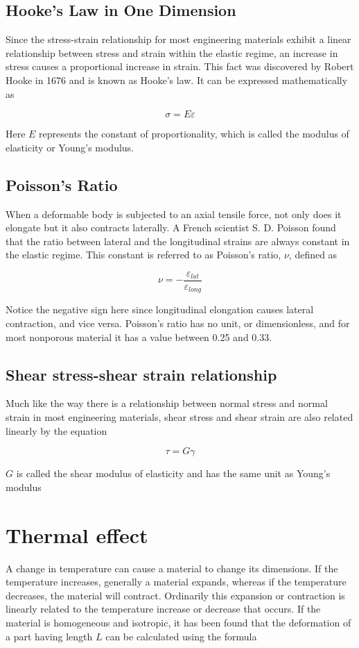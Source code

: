 \documentclass[a4paper,openany,12pt]{book}
\begin{document}
\subsection{Hooke's Law in One Dimension}
\label{sec:orge868fe9}
Since the stress-strain relationship for most engineering materials
exhibit a linear relationship between stress and strain within the
elastic regime, an increase in stress causes a proportional increase in
strain. This fact was discovered by Robert Hooke in 1676 and is known as
Hooke's law. It can be expressed mathematically as

$$\sigma  = E\varepsilon$$

Here \(E\) represents the constant of proportionality, which is called the
modulus of elasticity or Young's modulus.

\subsection{Poisson's Ratio}
\label{sec:orgaf6f6ed}
When a deformable body is subjected to an axial tensile force, not only
does it elongate but it also contracts laterally. A French scientist S.
D. Poisson found that the ratio between lateral and the longitudinal
strains are always constant in the elastic regime. This constant is
referred to as Poisson's ratio, \(\nu\), defined as


$$\nu  =  - \frac{\varepsilon _{lat}}{\varepsilon _{long}}$$

Notice the negative sign here since longitudinal elongation causes
lateral contraction, and vice versa. Poisson's ratio has no unit, or
dimensionless, and for most nonporous material it has a value between
0.25 and 0.33.

\subsection{Shear stress-shear strain relationship}
\label{sec:org9bc0579}
Much like the way there is a relationship between normal stress and
normal strain in most engineering materials, shear stress and shear
strain are also related linearly by the equation

$$\tau  = G\gamma$$

\(G\) is called the shear modulus of elasticity and has the same unit as
Young's modulus

\section{Thermal effect}
\label{sec:org02659da}
A change in temperature can cause a material to change its dimensions.
If the temperature increases, generally a material expands, whereas if
the temperature decreases, the material will contract. Ordinarily this
expansion or contraction is linearly related to the temperature increase
or decrease that occurs. If the material is homogeneous and isotropic,
it has been found that the deformation of a part having length \(L\) can
be calculated using the formula
\end{document}
